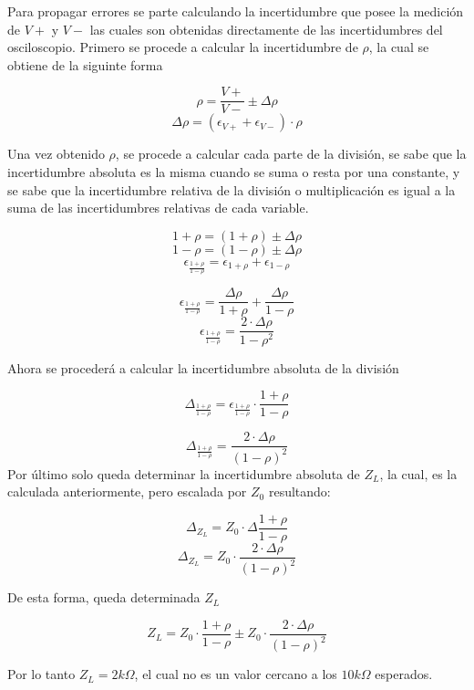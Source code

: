 \documentclass[a4paper,10pt]{article}
\begin{document}
	\indent Para propagar errores se parte calculando la incertidumbre que posee
	la medición de $V+$ y $V-$ las cuales son obtenidas directamente de las 
	incertidumbres del osciloscopio.
	\indent Primero se procede a calcular la incertidumbre de $\rho$, la cual se
	obtiene de la siguinte forma
	
	$$\rho = \frac{V+}{V-} \pm \Delta\rho$$
	$$\Delta\rho = (\epsilon_{V+} + \epsilon_{V-})\cdot\rho$$

	\indent Una vez obtenido $\rho$, se procede a calcular cada parte de la 
	división, se sabe que la incertidumbre absoluta es la misma cuando se suma o
	resta por una constante, y se sabe que la incertidumbre relativa de la 
	división o multiplicación es igual a la suma de las incertidumbres relativas
	de cada variable.

	$$1 + \rho = (1 + \rho) \pm \Delta\rho$$
	$$1 - \rho = (1 - \rho) \pm \Delta\rho$$
	$$\epsilon_{\frac{1 + \rho}{1 - \rho}} = \epsilon_{1 + \rho} + 
	\epsilon_{1 - \rho}$$

	$$\epsilon_{\frac{1 + \rho}{1 - \rho}} = \frac{\Delta\rho}{1 + \rho} + 
	\frac{\Delta\rho}{1 - \rho}$$
	$$\epsilon_{\frac{1 + \rho}{1 - \rho}} = \frac{2\cdot\Delta\rho}
	{1 - \rho^2}$$
	
	\indent Ahora se procederá a calcular la incertidumbre absoluta de la 
	división

	$$\Delta_{\frac{1 + \rho}{1 - \rho}} = \epsilon_{\frac{1 + \rho}{1 - \rho}}
	\cdot\frac{1+\rho}{1 - \rho}$$
	
	$$\Delta_{\frac{1 + \rho}{1 - \rho}} = \frac{2\cdot\Delta\rho}{(1 - \rho)^2}
	$$
	\indent Por último solo queda determinar la incertidumbre absoluta de $Z_L$,
	la cual, es la calculada anteriormente, pero escalada por $Z_0$ resultando:

	$$\Delta_{Z_L} = Z_0\cdot\Delta\frac{1 + \rho}{1 - \rho}$$
	$$\Delta_{Z_L} = Z_0\cdot\frac{2\cdot\Delta\rho}{(1 - \rho)^2}$$

	\indent De esta forma, queda determinada $Z_L$

	$$Z_L =Z_0\cdot\frac{1+\rho}{1-\rho} \pm Z_0\cdot\frac{2\cdot\Delta\rho}
	{(1 - \rho)^2}$$

	\indent Por lo tanto $Z_L=2k\Omega$, el cual no es un valor cercano a los
	$10k\Omega$  esperados.\\
		
\end{document}
